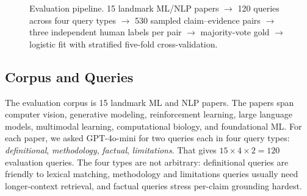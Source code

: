 \documentclass[10pt]{article}
\begin{document}
\begin{figure}[t]
\centering
{}
\caption{Evaluation pipeline. 15 landmark ML/NLP papers
$\rightarrow$ 120 queries across four query types $\rightarrow$ 530
sampled claim--evidence pairs $\rightarrow$ three independent human
labels per pair $\rightarrow$ majority-vote gold $\rightarrow$
logistic fit with stratified five-fold cross-validation.}
\label{fig:eval_pipeline}
\end{figure}

\subsection{Corpus and Queries}
The evaluation corpus is 15 landmark ML and NLP papers. The papers
span computer vision, generative modeling, reinforcement learning,
large language models, multimodal learning, computational biology,
and foundational ML. For each paper, we asked GPT-4o-mini for two
queries each in four query types: \emph{definitional},
\emph{methodology}, \emph{factual}, \emph{limitations}. That gives
$15 \times 4 \times 2 = 120$ evaluation queries. The four types are
not arbitrary: definitional queries are friendly to lexical
matching, methodology and limitations queries usually need
longer-context retrieval, and factual queries stress per-claim
grounding hardest.
\end{document}
